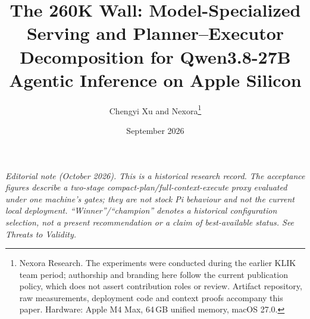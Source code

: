 \documentclass[11pt]{article}
\title{\textbf{The 260K Wall: Model-Specialized Serving and Planner--Executor Decomposition for Qwen3.8-27B Agentic Inference on Apple Silicon}}
\author{Chengyi Xu and Nexora\thanks{Nexora Research. The experiments were conducted during the earlier KLIK team period; authorship and branding here follow the current publication policy, which does not assert contribution roles or review. Artifact repository, raw measurements, deployment code and context proofs accompany this paper. Hardware: Apple M4 Max, 64\,GB unified memory, macOS 27.0.}}
\date{September 2026}
\begin{document}
\maketitle

\begin{center}
\begin{minipage}{0.93\linewidth}
\small\itshape
Editorial note (October 2026). This is a historical research record. The
acceptance figures describe a two-stage compact-plan/full-context-execute
proxy evaluated under one machine's gates; they are not stock Pi behaviour
and not the current local deployment. ``Winner''/``champion'' denotes a
historical configuration selection, not a present recommendation or a claim
of best-available status. See Threats to Validity.
\end{minipage}
\end{center}
\vspace{0.5em}
\end{document}

